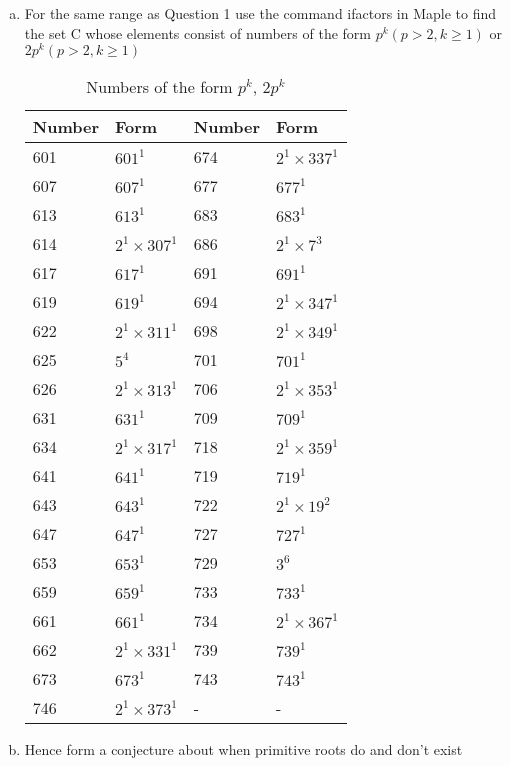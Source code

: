 \documentclass[11pt,a4paper,fleqn]{article}
\begin{document}
\begin{enumerate}[1.]
\begin{enumerate}[a.]
			\item For the same range as Question 1 use the command ifactors in Maple to find the set C whose elements consist of numbers of the form $p^k(p > 2, k \ge 1)$ or $2p^k(p > 2, k \ge 1)$
			\begin{table}[H]
				\centering
				\begin{tabular}{|l|l|l|l|}
					\hline
					Number & Form & Number & Form\\ \hline
					601 & $601^1$ & 674 & $2^1 \times 337^1$  \\ \hline
					607 & $607^1$ & 677 & $677^1$  \\ \hline
					613 & $613^1$ & 683 & $683^1$  \\ \hline
					614 & $2^1 \times 307^1$ & 686 & $2^1 \times 7^3$  \\ \hline
					617 & $617^1$ & 691 & $691^1$  \\ \hline
					619 & $619^1$ & 694 & $2^1 \times 347^1$  \\ \hline
					622 & $2^1 \times 311^1$ & 698 & $2^1 \times 349^1$  \\ \hline
					625 & $5^4$ & 701 & $701^1$  \\ \hline
					626 & $2^1 \times 313^1$ & 706 & $2^1 \times 353^1$  \\ \hline
					631 & $631^1$ & 709 & $709^1$  \\ \hline
					634 & $2^1 \times 317^1$ & 718 & $2^1 \times 359^1$  \\ \hline
					641 & $641^1$ & 719 & $719^1$  \\ \hline
					643 & $643^1$ & 722 & $2^1 \times 19^2$  \\ \hline
					647 & $647^1$ & 727 & $727^1$  \\ \hline
					653 & $653^1$ & 729 & $3^6$  \\ \hline
					659 & $659^1$ & 733 & $733^1$  \\ \hline
					661 & $661^1$ & 734 & $2^1 \times 367^1$  \\ \hline
					662 & $2^1 \times 331^1$ & 739 & $739^1$  \\ \hline
					673 & $673^1$ & 743 & $743^1$  \\ \hline
					746 & $2^1 \times 373^1$ & - & - \\ \hline					
				\end{tabular}
				\caption{Numbers of the form $p^k$, $2p^k$}
				\label{table:number_pk_2pk}
			\end{table}

			\item Hence form a conjecture about when primitive roots do and don’t exist
		\end{enumerate}
			


\end{enumerate}
\end{document}
